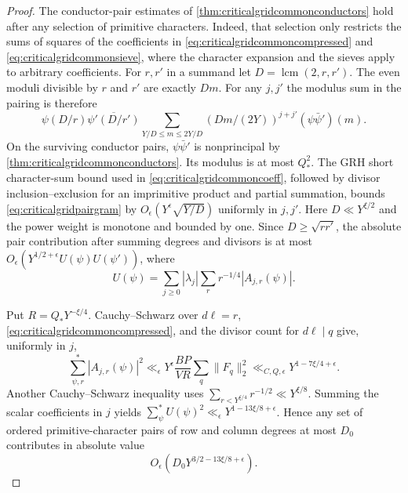 \documentclass[11pt,a4paper]{article}
\numberwithin{equation}{section}
\begin{document}
\begin{proof}
The conductor-pair estimates of
\cref{thm:criticalgridcommonconductors} hold after any
selection of primitive characters. Indeed, that selection
only restricts the sums of squares of the coefficients in
\cref{eq:criticalgridcommoncompressed} and
\cref{eq:criticalgridcommonsieve}, where the character
expansion and the sieves apply to arbitrary coefficients.
For $r,r'$ in a summand let $D=\operatorname{lcm}(2,r,r')$.
The even moduli divisible by $r$ and $r'$ are exactly $Dm$.
For any $j,j'$ the modulus sum in the pairing is therefore
\begin{equation}
 \psi(D/r)\overline{\psi'(D/r')}
 \sum_{Y/D\le m\le 2Y/D}
    (Dm/(2Y))^{j+j'}(\psi\bar\psi')(m).
 \label{eq:criticalgridpairgram}
\end{equation}
On the surviving conductor pairs, $\psi\bar\psi'$ is
nonprincipal by \cref{thm:criticalgridcommonconductors}.
Its modulus is at most $Q_*^2$.
The GRH short character-sum bound used in
\cref{eq:criticalgridcommoncoeff}, followed by divisor
inclusion--exclusion for an imprimitive product and partial
summation, bounds \cref{eq:criticalgridpairgram} by
$O_\epsilon(Y^\epsilon\sqrt{Y/D})$ uniformly in $j,j'$.
Here $D\ll Y^{\xi/2}$ and the power weight is monotone and bounded
by one. Since $D\ge\sqrt{rr'}$, the absolute pair contribution
after summing degrees and divisors is at most
$O_\epsilon(Y^{1/2+\epsilon} U(\psi)U(\psi'))$, where
\[
 U(\psi)=\sum_{j\ge0}|\lambda_j|\sum_r r^{-1/4}|A_{j,r}(\psi)|.
\]

Put $R=Q_*Y^{-\xi/4}$. Cauchy--Schwarz over $d\ell=r$,
\cref{eq:criticalgridcommoncompressed}, and the divisor count
for $d\ell\mid q$ give, uniformly in $j$,
\[
 \sum_{\psi,r}^*|A_{j,r}(\psi)|^2
 \ll_\epsilon Y^\epsilon\frac{BP}{V R}\sum_q\|F_q\|_2^2
 \ll_{C,Q,\epsilon}Y^{1-7\xi/4+\epsilon}.
\]
Another Cauchy--Schwarz inequality uses
$\sum_{r<Y^{\xi/4}}r^{-1/2}\ll Y^{\xi/8}$.
Summing the scalar coefficients in $j$ yields
$\sum_\psi^* U(\psi)^2\ll_\epsilon Y^{1-13\xi/8+\epsilon}$.
Hence any set of ordered primitive-character pairs of row and
column degrees at most $D_0$ contributes in absolute value
\begin{equation}
 O_\epsilon(D_0 Y^{3/2-13\xi/8+\epsilon}).
 \label{eq:criticalgridpairdegreechars}
\end{equation}


\end{proof}
\end{document}
